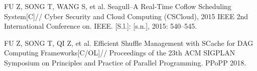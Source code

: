 
\begin{publications}{99}
    \item\textsc{FU Z, SONG T, WANG S}, et al. {Seagull–A Real-Time Coflow Scheduling System}[C]// Cyber Security
    and Cloud Computing (CSCloud), 2015 IEEE 2nd International Conference on. IEEE. [S.l.]: [s.n.],
    2015: 540–545.
    \item\textsc{FU Z, SONG T, QI Z}, et al. {Efficient Shuffle Management with SCache for DAG Computing Frameworks}[C/OL]// Proceedings of the 23th ACM SIGPLAN Symposium on Principles and Practice of
    Parallel Programming. PPoPP 2018.
\end{publications}
